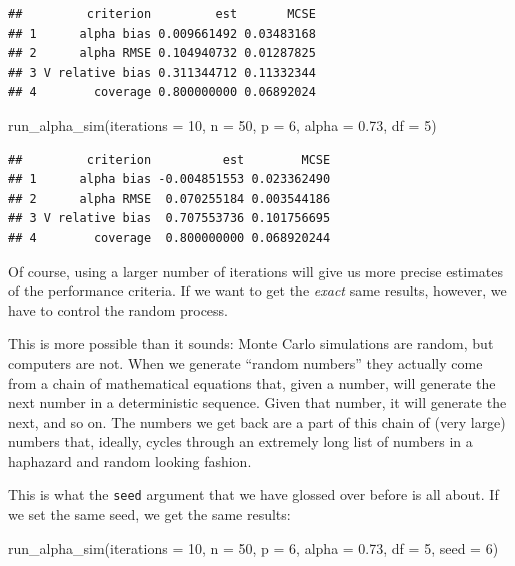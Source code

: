 \documentclass[
]{book}
\newenvironment{Shaded}{\begin{snugshade}}{\end{snugshade}}
\newcommand{\AttributeTok}[1]{\textcolor[rgb]{0.77,0.63,0.00}{#1}}
\newcommand{\DecValTok}[1]{\textcolor[rgb]{0.00,0.00,0.81}{#1}}
\newcommand{\FloatTok}[1]{\textcolor[rgb]{0.00,0.00,0.81}{#1}}
\newcommand{\FunctionTok}[1]{\textcolor[rgb]{0.00,0.00,0.00}{#1}}
\newcommand{\NormalTok}[1]{#1}
\begin{document}
\begin{verbatim}
##         criterion         est       MCSE
## 1      alpha bias 0.009661492 0.03483168
## 2      alpha RMSE 0.104940732 0.01287825
## 3 V relative bias 0.311344712 0.11332344
## 4        coverage 0.800000000 0.06892024
\end{verbatim}

\begin{Shaded}
\begin{Highlighting}[]
\FunctionTok{run\_alpha\_sim}\NormalTok{(}\AttributeTok{iterations =} \DecValTok{10}\NormalTok{, }\AttributeTok{n =} \DecValTok{50}\NormalTok{, }\AttributeTok{p =} \DecValTok{6}\NormalTok{, }\AttributeTok{alpha =} \FloatTok{0.73}\NormalTok{, }\AttributeTok{df =} \DecValTok{5}\NormalTok{)}
\end{Highlighting}
\end{Shaded}

\begin{verbatim}
##         criterion          est        MCSE
## 1      alpha bias -0.004851553 0.023362490
## 2      alpha RMSE  0.070255184 0.003544186
## 3 V relative bias  0.707553736 0.101756695
## 4        coverage  0.800000000 0.068920244
\end{verbatim}

Of course, using a larger number of iterations will give us more precise estimates of the performance criteria. If we want to get the \emph{exact} same results, however, we have to control the random process.

This is more possible than it sounds: Monte Carlo simulations are random, but computers are not.
When we generate ``random numbers'' they actually come from a chain of mathematical equations that, given a number, will generate the next number in a deterministic sequence.
Given that number, it will generate the next, and so on.
The numbers we get back are a part of this chain of (very large) numbers that, ideally, cycles through an extremely long list of numbers in a haphazard and random looking fashion.

This is what the \texttt{seed} argument that we have glossed over before is all about.
If we set the same seed, we get the same results:

\begin{Shaded}
\begin{Highlighting}[]
\FunctionTok{run\_alpha\_sim}\NormalTok{(}\AttributeTok{iterations =} \DecValTok{10}\NormalTok{, }\AttributeTok{n =} \DecValTok{50}\NormalTok{, }\AttributeTok{p =} \DecValTok{6}\NormalTok{, }\AttributeTok{alpha =} \FloatTok{0.73}\NormalTok{, }\AttributeTok{df =} \DecValTok{5}\NormalTok{, }\AttributeTok{seed =} \DecValTok{6}\NormalTok{)}
\end{Highlighting}
\end{Shaded}
\end{document}
